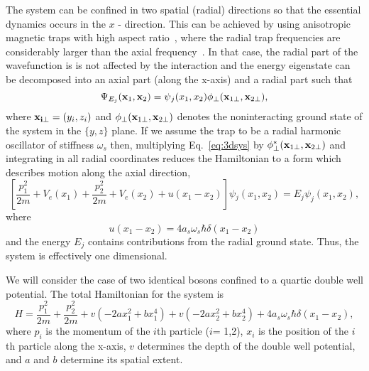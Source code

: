 The system can be confined in two spatial (radial) directions so that the essential dynamics occurs in the $x$ - direction. This can be achieved by using anisotropic magnetic traps with high aspect ratio~\cite{olshanii:1d},  where the radial trap frequencies are considerably larger than the  axial frequency~\cite{petrov:1d}. In that case, the radial part of the wavefunction is is not affected by the interaction and the energy eigenstate can be decomposed into an axial part (along the x-axis) and a radial part such that
%
\begin{equation}
\Psi_{E_j}({\bf x}_1, {\bf x}_2) =\psi{_j}(x_1,x_2) \phi_\bot ({\bf x}_{1\bot},{\bf x}_{2\bot}),
\end{equation}
%
where ${\bf x_{i\bot}}=(y_i,z_i)$ and  $\phi_\bot ({\bf x}_{1\bot},{\bf x}_{2\bot})$ denotes the noninteracting ground state of the system in the $\lbrace y, z\rbrace$ plane.  If we assume the trap to be a radial harmonic oscillator of stiffness $\omega_s$ then, multiplying Eq.~\eqref{eq:3dsys} by $\phi^*_\bot ({\bf x}_{1\bot},{\bf x}_{2\bot})$ and integrating in all radial coordinates reduces the Hamiltonian to a form which describes motion along the axial direction,
%
\begin{equation}
\left[ \frac{p^2_1}{2m}+V_e(x_1) + \frac{p^2_2}{2m} + V_e(x_2)+u(x_1-x_2) \right] \psi{_j}(x_1,x_2)
=E_j \psi_{j}(x_1,x_2),
\end{equation}
%
where
\begin{equation}
u(x_1-x_2) = 4a_s \omega_s \hbar \delta(x_1-x_2)
\end{equation}
%
and the energy $E_j$ contains contributions from the radial ground state. Thus, the system is effectively one dimensional.

We will consider the case of  two identical bosons  confined to a quartic double well potential.
The total Hamiltonian for the system is 
%
\begin{equation}
H =\frac{p^2_1}{2m}+\frac{p^2_2}{2m}+v(-2a x_1^2+b x_1^4) +v(-2a x_2^2+b x_2^4)+4a_s \omega_s \hbar \delta(x_1-x_2) ,
\end{equation}
%
where $p_i$ is the momentum of the $i$th particle ($i$= 1,2), $x_i$ is the position of the $i$th particle along the x-axis,  $v$ determines the depth of the double well potential, and $a$ and $b$ determine its spatial extent.

